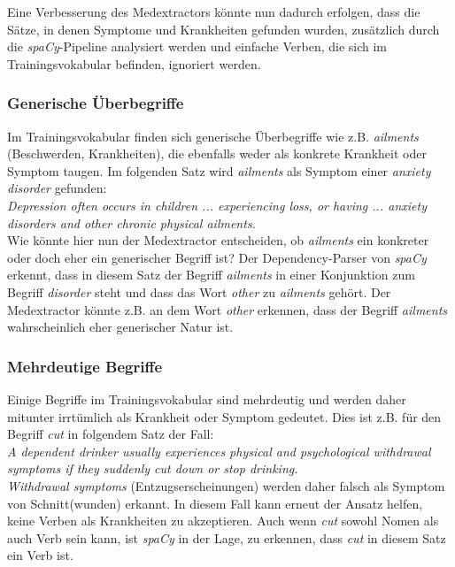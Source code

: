 Eine Verbesserung des Medextractors könnte nun dadurch erfolgen, dass die Sätze, in denen Symptome und Krankheiten gefunden wurden, zusätzlich durch die \emph{spaCy}-Pipeline analysiert werden und einfache Verben, die sich im Trainingsvokabular befinden, ignoriert werden.

\subsubsection{Generische Überbegriffe}
\label{subsec: generisch} 

Im Trainingsvokabular finden sich generische Überbegriffe wie z.B. \emph{ailments} (Beschwerden, Krankheiten), die ebenfalls weder als konkrete Krankheit oder Symptom taugen. Im folgenden Satz wird \emph{ailments} als Symptom einer \emph{anxiety disorder} gefunden:\\

\emph{\glqq Depression often occurs in children ... experiencing loss, or having ... anxiety disorders and other chronic physical ailments.\grqq}\\

Wie könnte hier nun der Medextractor entscheiden, ob \emph{ailments} ein konkreter oder doch eher ein generischer Begriff ist? Der Dependency-Parser von \emph{spaCy} erkennt, dass in diesem Satz der Begriff \emph{ailments} in einer Konjunktion zum Begriff \emph{disorder} steht und dass das Wort \emph{other} zu \emph{ailments} gehört. Der Medextractor könnte z.B. an dem Wort \emph{other} erkennen, dass der Begriff \emph{ailments} wahrscheinlich eher generischer Natur ist.

\subsubsection{Mehrdeutige Begriffe}
\label{subsec: mehrdeutig} 

Einige Begriffe im Trainingsvokabular sind mehrdeutig und werden daher mitunter irrtümlich als Krankheit oder Symptom gedeutet. Dies ist z.B. für den Begriff \emph{cut} in folgendem Satz der Fall:\\

\emph{\glqq A dependent drinker usually experiences physical and psychological withdrawal symptoms if they suddenly cut down or stop drinking.\grqq}\\

\emph{Withdrawal symptoms} (Entzugserscheinungen) werden daher falsch als Symptom von Schnitt(wunden) erkannt. In diesem Fall kann erneut der Ansatz helfen, keine Verben als Krankheiten zu akzeptieren. Auch wenn \emph{cut} sowohl Nomen als auch Verb sein kann, ist \emph{spaCy} in der Lage, zu erkennen, dass \emph{cut} in diesem Satz ein Verb ist.

